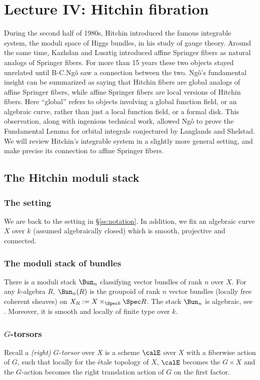 \section{Lecture IV: Hitchin fibration} 

During the second half of 1980s, Hitchin introduced the famous integrable system, the moduli space of Higgs bundles, in his study of gauge theory. Around the same time, Kazhdan and Lusztig introduced affine Springer fibers as natural analogs of Springer fibers. For more than 15 years these two objects stayed unrelated until B-C.Ng\^o saw a connection between the two. Ng\^o's fundamental insight can be summarized as saying that Hitchin fibers are global analogs of affine Springer fibers, while affine Springer fibers are local versions of Hitchin fibers. Here ``global'' refers to objects involving a global function field, or an algebraic curve, rather than just a local function field, or a formal disk.  This observation, along with ingenious technical work, allowed Ng\^o to prove the Fundamental Lemma for orbital integrals conjectured by Langlands and Shelstad. We will review Hitchin's integrable system in a slightly more general setting, and make precise its connection to affine Springer fibers.




\subsection{The Hitchin moduli stack}

\subsubsection{The setting} We are back to the setting in \S\ref{ss:notation}. In addition, we fix an algebraic curve $X$ over $k$ (assumed algebraically closed) which is smooth, projective and connected.


\subsubsection{The moduli stack of bundles}
There is a moduli stack $\Bun_{n}$ classifying vector bundles of rank $n$ over $X$.  For any $k$-algebra $R$, $\Bun_{n}(R)$ is the groupoid of rank $n$ vector bundles (locally free coherent sheaves) on $X_{R}:=X\times_{\Spec k}\Spec R$. The stack $\Bun_{n}$ is algebraic, see \cite[Th 4.6.2.1]{LMB}. Moreover, it is smooth and locally of finite type over $k$.

\subsubsection{$G$-torsors}
Recall a {\em (right) $G$-torsor} over $X$ is a scheme $\calE$ over $X$ with a fiberwise action of $G$, such that locally for the \'etale topology of $X$, $\calE$ becomes the $G\times X$ and the $G$-action becomes the right translation action of $G$ on the first factor. 



